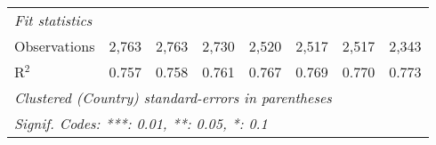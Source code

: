 \begin{tabular}{lccccccc}
   \midrule \emph{Fit statistics}\\
   Observations                                                                & 2,763         & 2,763         & 2,730         & 2,520         & 2,517        & 2,517        & 2,343\\  
   R$^2$                                                                       & 0.757         & 0.758         & 0.761         & 0.767         & 0.769        & 0.770        & 0.773\\  
   \midrule
   \multicolumn{8}{l}{\emph{Clustered (Country) standard-errors in parentheses}}\\
   \multicolumn{8}{l}{\emph{Signif. Codes: ***: 0.01, **: 0.05, *: 0.1}}\\
\end{tabular}
\par\endgroup


